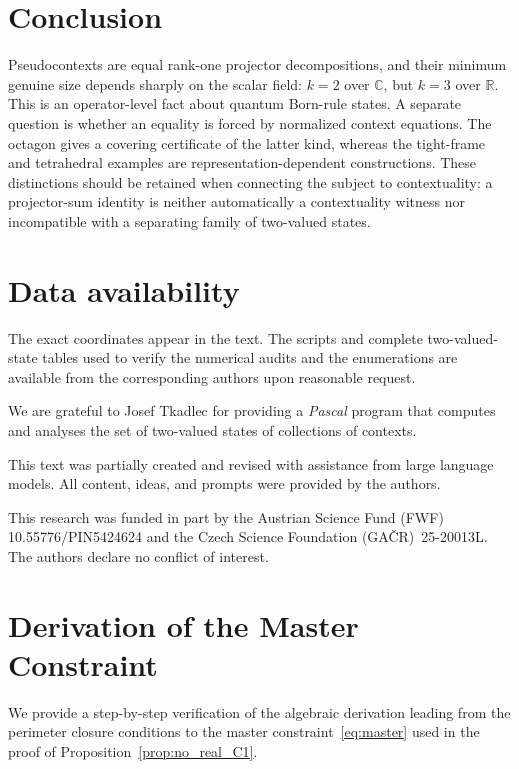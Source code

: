 \documentclass[
  twocolumn,
  aps,
  pra,
  floatfix,
  amsmath,amssymb,
  longbibliography
]{revtex4-2}
\theoremstyle{definition}
\theoremstyle{remark}
\begin{document}
\section{Conclusion}
\label{sec:conclusion}

Pseudocontexts are equal rank-one projector decompositions, and their
minimum genuine size depends sharply on the scalar field: $k=2$ over
\(\mathbb C\), but $k=3$ over \(\mathbb R\).  This is an operator-level
fact about quantum Born-rule states.  A separate question is whether an
equality is forced by normalized context equations.  The octagon gives a
covering certificate of the latter kind, whereas the tight-frame and
tetrahedral examples are representation-dependent constructions.  These
distinctions should be retained when connecting the subject to
contextuality: a projector-sum identity is neither automatically a
contextuality witness nor incompatible with a separating family of
two-valued states.

\section*{Data availability}
The exact coordinates appear in the text.  The scripts and complete
two-valued-state tables used to verify the numerical audits and the
enumerations  are available from the corresponding authors
upon reasonable request.

\begin{acknowledgments}
We are grateful to Josef Tkadlec for providing a {\em Pascal} program that computes and analyses the set of two-valued states of collections of contexts.

This text was partially created and revised with assistance from large language models.  All content, ideas, and prompts were provided by the authors.

This research was funded in part by the Austrian Science Fund (FWF)
10.55776/PIN5424624 and the Czech Science Foundation
(GA\v{C}R)~25-20013L. The authors declare no conflict of interest.
\end{acknowledgments}
\appendix



\section{Derivation of the Master Constraint}
\label{app:master_derivation}

We provide a step-by-step verification of the algebraic derivation
leading from the perimeter closure conditions to the master
constraint~\eqref{eq:master} used in the proof of
Proposition~\ref{prop:no_real_C1}.
\end{document}
